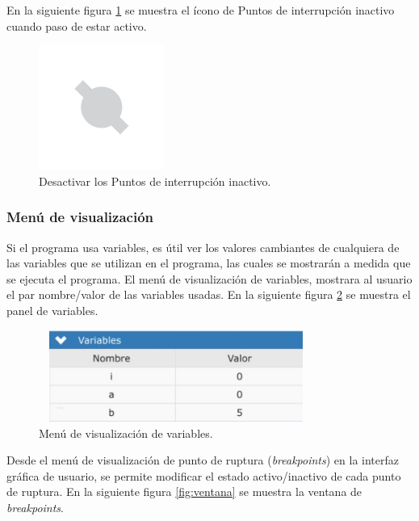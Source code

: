 En la siguiente figura \ref{fig:skip_all_breakpoints_inactive} se muestra el ícono de Puntos de interrupción inactivo cuando paso de estar activo.

\begin{figure}[!htbp]
	\begin{center}  %
		\includegraphics[scale=.80]{./Figures/skip_all_breakpoints_inactive.PNG}
		\par\caption{Desactivar los Puntos de interrupción inactivo.}\label{fig:skip_all_breakpoints_inactive}
	\end{center}
\end{figure}

\subsubsection{Menú de visualización}
\label{subsubsec:Iniciar/Menú de visualización}


Si el programa usa variables, es útil ver los valores cambiantes de cualquiera de las variables que se utilizan en el programa, las cuales se mostrarán a medida que se ejecuta el programa.
El menú de visualización de variables, mostrara al usuario el par nombre/valor de las variables usadas. En la siguiente figura \ref{fig:ventana-variables} se muestra el panel de variables.

\begin{figure}[!htbp]
	\centering
	\includegraphics*[width=9cm,height=3cm]{./Figures/ventana-variables.PNG}
	\caption{Menú de visualización de variables.}
	\par\label{fig:ventana-variables}
\end{figure}

Desde el menú de visualización de punto de ruptura (\emph{breakpoints}) en la interfaz gráfica de usuario, se permite modificar el estado activo/inactivo de cada punto de ruptura. En la siguiente figura \ref{fig:ventana} se muestra la ventana de \emph{breakpoints}.

